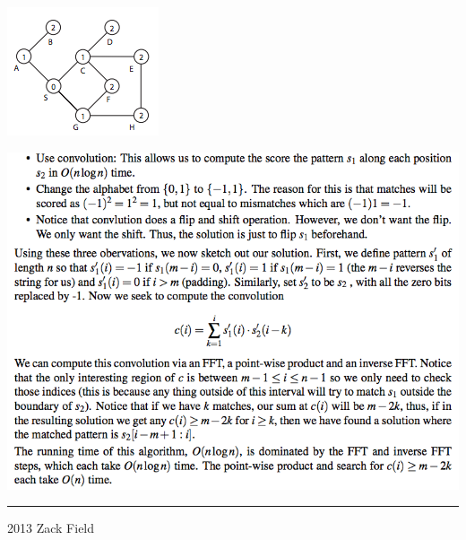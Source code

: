 \documentclass[10pt,landscape]{article}
\newenvironment{Figure}
  {\par\medskip\noindent\minipage{\linewidth}}
  {\endminipage\par\medskip}
\begin{document}
\begin{multicols}{3}
\begin{Figure}
    \includegraphics[scale=0.7]{BFS}
\end{Figure}

\begin{Figure}
 \includegraphics[scale=0.3]{convolution}
\end{Figure}
\rule{0.3\linewidth}{0.25pt}
\scriptsize



2013 Zack Field


\end{multicols}
\end{document}
